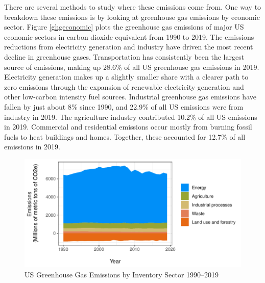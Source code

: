 There are several methods to study where these emissions come from. One way to breakdown these emissions is by looking at greenhouse gas emissions by economic sector. Figure \ref{ghgeconomic} plots the greenhouse gas emissions of major US economic sectors in carbon dioxide equivalent from 1990 to 2019.  The emissions reductions from electricity generation and industry have driven the most recent decline in greenhouse gases. Transportation has consistently been the largest source of emissions, making up 28.6\% of all US greenhouse gas emissions in 2019. Electricity generation makes up a slightly smaller share with a clearer path to zero emissions through the expansion of renewable electricity generation and other low-carbon intensity fuel sources. Industrial greenhouse gas emissions have fallen by just about 8\% since 1990, and 22.9\% of all US emissions were from industry in 2019. The agriculture industry contributed 10.2\% of all US emissions in 2019. Commercial and residential emissions occur mostly from burning fossil fuels to heat buildings and homes. Together, these accounted for 12.7\% of all emissions in 2019. 

\begin{figure}
\caption{US Greenhouse Gas Emissions by Inventory Sector 1990--2019}
\centering
\includegraphics[width=\textwidth]{figures/chapter1_figures/ghg_inventory.pdf}
\end{figure}

